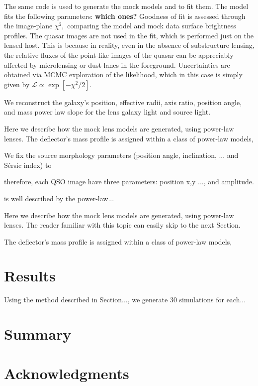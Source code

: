 \documentclass[a4paper,11pt]{article}
\begin{document}
The same code is used to generate the mock models and to fit them. The model fits the following parameters: \textbf{which ones?}  Goodness of fit is assessed through the image-plane $\chi^{2},$ comparing the model and mock data surface brightness profiles. The quasar images are not used in the fit, which is performed just on the lensed host. This is because in reality, even in the absence of substructure lensing, the relative fluxes of the point-like images of the quasar can be appreciably affected by microlensing or dust lanes in the foreground. Uncertainties are obtained via MCMC exploration of the likelihood, which in this case is simply given by $\mathcal{L}\propto\exp[-\chi^{2}/2].$

We reconstruct the galaxy's position, effective radii, axis ratio, position angle, and mass power law slope for the lens galaxy light and source light. 



Here we describe how the mock lens models are generated, using power-law lenses. The deflector’s mass profile is assigned within a class of power-law models,

We fix the source morphology parameters (position angle, inclination, ... and S\'ersic index) to

therefore, each QSO image have three parameters: position x,y ..., and amplitude. 

is well described by the power-law...

Here we describe how the mock lens models are generated, using power-law lenses. The reader familiar with this topic can easily skip to the next Section.

The deflector's mass profile is assigned within a class of power-law models,


\section{Results}

Using the method described in Section..., we generate 30 simulations for each...


\section{Summary}

\section*{Acknowledgments}
\end{document}
